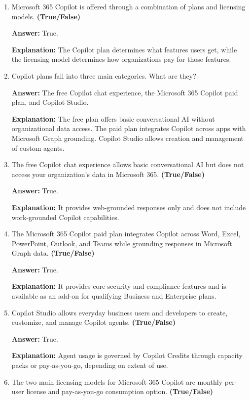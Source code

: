 \documentclass[10pt]{article}
\begin{document}
\begin{enumerate}[leftmargin=*]

\item Microsoft 365 Copilot is offered through a combination of plans and licensing models. \textbf{(True/False)}

\textbf{Answer:} True.

\textbf{Explanation:} The Copilot plan determines what features users get, while the licensing model determines how organizations pay for those features.

\item Copilot plans fall into three main categories. What are they?

\textbf{Answer:} The free Copilot chat experience, the Microsoft 365 Copilot paid plan, and Copilot Studio.

\textbf{Explanation:} The free plan offers basic conversational AI without organizational data access. The paid plan integrates Copilot across apps with Microsoft Graph grounding. Copilot Studio allows creation and management of custom agents.

\item The free Copilot chat experience allows basic conversational AI but does not access your organization’s data in Microsoft 365. \textbf{(True/False)}

\textbf{Answer:} True.

\textbf{Explanation:} It provides web-grounded responses only and does not include work-grounded Copilot capabilities.

\item The Microsoft 365 Copilot paid plan integrates Copilot across Word, Excel, PowerPoint, Outlook, and Teams while grounding responses in Microsoft Graph data. \textbf{(True/False)}

\textbf{Answer:} True.

\textbf{Explanation:} It provides core security and compliance features and is available as an add-on for qualifying Business and Enterprise plans.

\item Copilot Studio allows everyday business users and developers to create, customize, and manage Copilot agents. \textbf{(True/False)}

\textbf{Answer:} True.

\textbf{Explanation:} Agent usage is governed by Copilot Credits through capacity packs or pay-as-you-go, depending on extent of use.

\item The two main licensing models for Microsoft 365 Copilot are monthly per-user license and pay-as-you-go consumption option. \textbf{(True/False)}


\end{enumerate}
\end{document}
